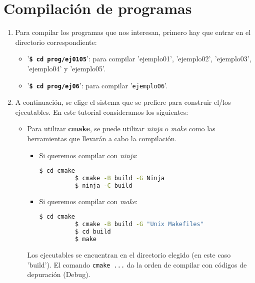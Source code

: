 %

\section{Compilación de programas}\label{sec:compilacion}

\begin{enumerate}
  \item Para compilar los programas que nos interesan, primero hay que entrar en el directorio correspondiente:
\begin{itemize}
  \tightlist
\item '\textbf{\texttt{\$ cd prog/ej0105}}':
  para compilar '\textsf{ejemplo01}', '\textsf{ejemplo02}', '\textsf{ejemplo03}', '\textsf{ejemplo04}'
  y '\textsf{ejemplo05}'.
\item '\textbf{\texttt{\$ cd prog/ej06}}': para compilar '\texttt{ejemplo06}'.
\end{itemize}

\item A continuación, se elige el sistema que se prefiere para construir el/los ejecutables.
  En este tutorial consideramos los siguientes:
  \begin{itemize}
    \tightlist
  \item Para utilizar \textbf{cmake}, se puede utilizar \emph{ninja} o \emph{make} como las herramientas
    que llevarán a cabo la compilación.
    \begin{itemize}
      \item Si queremos compilar con \emph{ninja}:
        \begin{lstlisting}[language=bash]
          $ cd cmake
          $ cmake -B build -G Ninja
          $ ninja -C build
        \end{lstlisting}
      \item Si queremos compilar con \emph{make}:
        \begin{lstlisting}[language=bash]
          $ cd cmake
          $ cmake -B build -G "Unix Makefiles"
          $ cd build
          $ make
        \end{lstlisting}
    \end{itemize}
    Los ejecutables se encuentran en el directorio elegido (en este caso 'build').
    El comando \texttt{cmake ...} da la orden de compilar con códigos de depuración (\textsf{Debug}).


\end{itemize}
\end{enumerate}
